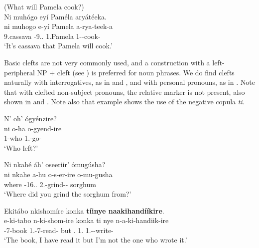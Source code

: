\documentclass[output=paper]{langscibook}
\begin{document}
\z

\ea
\label{bkm:Ref111468376}
(What will Pamela cook?)\\
Ni muhógo eyí Paméla aryátéeka.\\
\gll
ni  muhogo  e-yí   Pamela  a-rya-teek-a\\
\COP{}  9.cassava  \AUG{}-9.\REL{}.\PRO{}  1.Pamela  1\SM{}-\FUT{}-cook-\FV{}\\
\glt
‘It’s cassava that Pamela will cook.’\\


\z


Basic clefts are not very commonly used, and a construction with a left\hyp peripheral NP + cleft (see ) is preferred for noun phrases. We do find clefts naturally with interrogatives, as in  and , and with personal pronouns, as in . Note that with clefted non-subject pronouns, the relative marker is not present, also shown in  and . Note also that example  shows the use of the negative copula \textit{ti}.

\ea
\label{bkm:Ref98944488}
N’ oh’ ógyénzire?\\
\gll
ni  o-ha  o-gyend-ire\\
\COP{}  1-who  1\SM{}.\REL{}-go-\PFV{}\\
\glt
‘Who left?’\\


\z

\ea
\label{bkm:Ref115082992}
Ni nkahé áh’ oseeriir’ ómugúsha?\\
\gll
ni  nkahe  a-hu  o-s-er-ire  o-mu-gusha\\
\COP{}  where  \AUG{}-{}16.\REL{}.\PRO{}  2\SG{}.\SM{}-grind-\APPL{}-\PFV{}  sorghum\\
\glt
‘Where did you grind the sorghum from?’\\


\z

\ea
\label{bkm:Ref135725730}
\label{bkm:Ref111469643}
Ekitábo nkishomíre konka \textbf{tíinye naakihandííkire}.\\
\gll
e-ki-tabo  n-ki-shom-ire  konka  ti  nye n-a-ki-handiik-ire\\
\AUG{}-7-book  1\SG{}.\SM{}-7\OM{}-read-\PFV{}  but  \NEG{}.\COP{}  1\SG{}.\PRO{}  1\SG.\SM-\OM{}-write-\PFV{}\\
\glt
‘The book, I have read it but I’m not the one who wrote it.’\\
\end{document}
